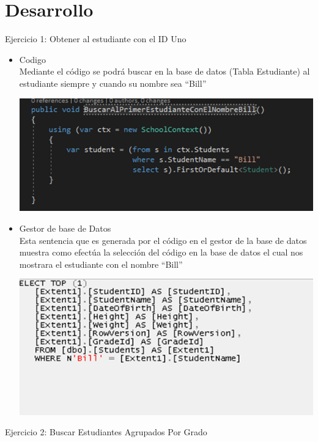 \section{Desarrollo} 
Ejercicio 1: Obtener al estudiante con el ID Uno
\begin{itemize}
	\item Codigo
	\\Mediante el código se podrá buscar en la base de datos (Tabla Estudiante) al estudiante siempre y cuando su nombre sea “Bill”
	\begin{center}
	\includegraphics[width=15cm]{./Imagenes/1a} 
	\end{center}
	\item Gestor de base de Datos
	\\Esta sentencia que es generada por el código en el gestor de la base de datos muestra como efectúa la selección del código en la base de datos el cual nos mostrara el estudiante con el nombre “Bill”
	\begin{center}
	\includegraphics[width=15cm]{./Imagenes/1b} 
	\end{center}
\end{itemize} 

\newpage
Ejercicio 2: Buscar Estudiantes Agrupados Por Grado

